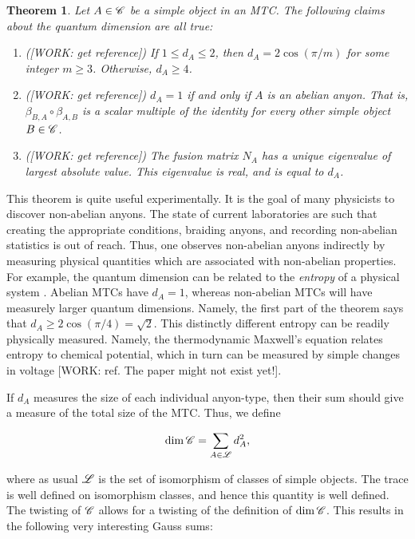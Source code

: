 \documentclass{article}
\newtheorem{theorem}{Theorem}[section]
\theoremstyle{definition}
\numberwithin{figure}{section}
\begin{document}
\begin{theorem} Let $A\in \mathscr{C}$ be a simple object in an MTC. The following claims about the quantum dimension are all true:

\begin{enumerate}

\item ([WORK: get reference]) If $1\leq d_A\leq 2$, then $d_A=2\cos(\pi /m)$ for some integer $m\geq 3$. Otherwise, $d_A\geq 4$.

\item ([WORK: get reference]) $d_A=1$ if and only if $A$ is an abelian anyon. That is, $\beta_{B,A}\circ \beta_{A,B}$ is a scalar multiple of the identity for every other simple object $B\in \mathscr{C}$.

\item ([WORK: get reference]) The fusion matrix $N_A$ has a unique eigenvalue of largest absolute value. This eigenvalue is real, and is equal to $d_A$.
\end{enumerate}
\end{theorem}

This theorem is quite useful experimentally. It is the goal of many physicists to discover non-abelian anyons. The state of current laboratories are such that creating the appropriate conditions, braiding anyons, and recording non-abelian statistics is out of reach. Thus, one observes non-abelian anyons indirectly by measuring physical quantities which are associated with non-abelian properties. For example, the quantum dimension can be related to the \textit{entropy} of a physical system \cite{kitaev2006topological}. Abelian MTCs have $d_A=1$, whereas non-abelian MTCs will have measurely larger quantum dimensions. Namely, the first part of the theorem says that $d_A\geq 2\cos(\pi/4)=\sqrt{2}$. This distinctly different entropy can be readily physically measured. Namely, the thermodynamic Maxwell's equation relates entropy to chemical potential, which in turn can be measured by simple changes in voltage [WORK: ref. The paper might not exist yet!].

If $d_A$ measures the size of each individual anyon-type, then their sum should give a measure of the total size of the MTC. Thus, we define

$$\dim \mathscr{C} = \sum_{A\in \mathscr{L}} d_A^2,$$

where as usual $\mathscr{L}$ is the set of isomorphism of classes of simple objects. The trace is well defined on isomorphism classes, and hence this quantity is well defined. The twisting of $\mathscr{C}$ allows for a twisting of the definition of $\dim \mathscr{C}$. This results in the following very interesting Gauss sums:
\end{document}

